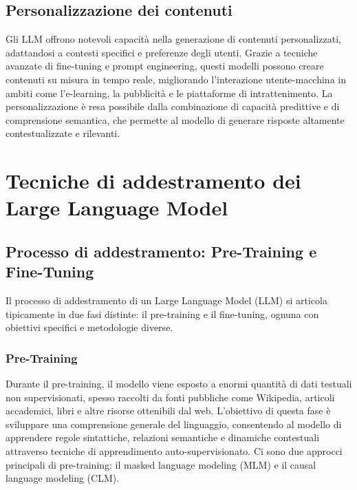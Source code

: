 \documentclass[target=mst,aauheader=,style=]{thud}
\begin{document}
\subsection{Personalizzazione dei contenuti}
Gli LLM offrono notevoli capacità nella generazione di contenuti personalizzati, adattandosi a contesti specifici e preferenze degli utenti. Grazie a tecniche avanzate di fine-tuning e prompt engineering, questi modelli possono creare contenuti su misura in tempo reale, migliorando l'interazione utente-macchina in ambiti come l'e-learning, la pubblicità e le piattaforme di intrattenimento. La personalizzazione è resa possibile dalla combinazione di capacità predittive e di comprensione semantica, che permette al modello di generare risposte altamente contestualizzate e rilevanti.


\section{Tecniche di addestramento dei Large Language Model}

\subsection{Processo di addestramento: Pre-Training e Fine-Tuning}
Il processo di addestramento di un Large Language Model (LLM) si articola tipicamente in due fasi distinte: il pre-training e il fine-tuning, ognuna con obiettivi specifici e metodologie diverse.

\subsubsection{Pre-Training}
Durante il pre-training, il modello viene esposto a enormi quantità di dati testuali non supervisionati, spesso raccolti da fonti pubbliche come Wikipedia, articoli accademici, libri e altre risorse ottenibili dal web. L’obiettivo di questa fase è sviluppare una comprensione generale del linguaggio, consentendo al modello di apprendere regole sintattiche, relazioni semantiche e dinamiche contestuali attraverso tecniche di apprendimento auto-supervisionato.
Ci sono due approcci principali di pre-training: il masked language modeling (MLM) e il causal language modeling (CLM).
\end{document}
